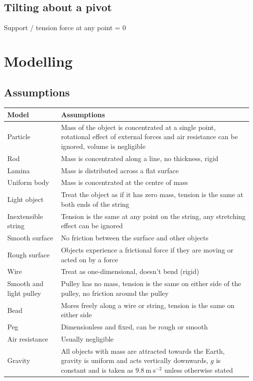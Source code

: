 \documentclass[A4paper, 11pt]{article}
\begin{document}
	\subsection{Tilting about a pivot}
	Support / tension force at any point = 0
	


	\section{Modelling}
	\subsection{Assumptions}
	\begin{tabular}{|m{3.9cm} | m{13.5cm}|}
		\hline
		\textbf{Model} & \textbf{Assumptions} \\
		\hline
		Particle & Mass of the object is concentrated at a single point, rotational effect of external forces and air resistance can be ignored, volume is negligible \\
		\hline
		Rod & Mass is concentrated along a line, no thickness, rigid \\
		\hline
		Lamina & Mass is distributed across a flat surface \\
		\hline
		Uniform body & Mass is concentrated at the centre of mass \\
		\hline
		Light object & Treat the object as if it has zero mass, tension is the same at both ends of the string  \\
		\hline
		Inextensible string & Tension is the same at any point on the string, any stretching effect can be ignored \\
		\hline
		Smooth surface & No friction between the surface and other objects\\
		\hline
		Rough surface &  Objects experience a frictional force if they are moving or acted on by a force  \\
		\hline
		Wire &  Treat as one-dimensional, doesn't bend (rigid) \\
		\hline
		Smooth and light pulley & Pulley has no mass, tension is the same on either side of the pulley, no friction around the pulley \\
		\hline
		Bead & Mores freely along a wire or string, tension is the same on either side  \\
		\hline
		Peg & Dimensionless and fixed, can be rough or smooth \\
		\hline
		Air resistance & Usually negligible  \\
		\hline
		Gravity &  All objects with mass are attracted towards the Earth, gravity is uniform and acts vertically downwards, $g$ is constant and is taken as $9.8 \: \mathrm{m} \: \mathrm{s}^{-2}$ unless otherwise stated \\
		\hline
	\end{tabular}
	
	
	
	
\end{document}

